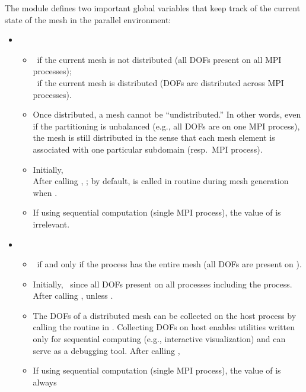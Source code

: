 The  module defines two important global variables that keep track of the current state of the mesh in the parallel environment:
\begin{itemize}
	\item {}
	\begin{itemize} \itemsep 2pt
		\item {}~if the current mesh is not distributed (all DOFs present on all MPI processes);\\
		~if the current mesh is distributed (DOFs are distributed across MPI processes).
		\item Once distributed, a mesh cannot be ``undistributed.'' In other words, even if the partitioning is unbalanced (e.g., all DOFs are on one MPI process), the mesh is still distributed in the sense that each mesh element is associated with one particular subdomain (resp.\ MPI process).
		\item Initially, \\
		After calling , ; by default,  is called in routine  during mesh generation when . 
		\item If using sequential computation (single MPI process), the value of  is irrelevant.
	\end{itemize}
	\item {}
	\begin{itemize} \itemsep 2pt
	\item {}~if and only if the  process has the entire mesh (all DOFs are present on ).
	\item Initially, \ since all DOFs present on all processes including the  process. After calling ,  unless .
	\item The DOFs of a distributed mesh can be collected on the host process by calling the  routine in . Collecting DOFs on host enables utilities written only for sequential computing (e.g., interactive visualization) and can serve as a debugging tool. After calling , 
	\item If using sequential computation (single MPI process), the value of  is always 
	\end{itemize}
\end{itemize}

